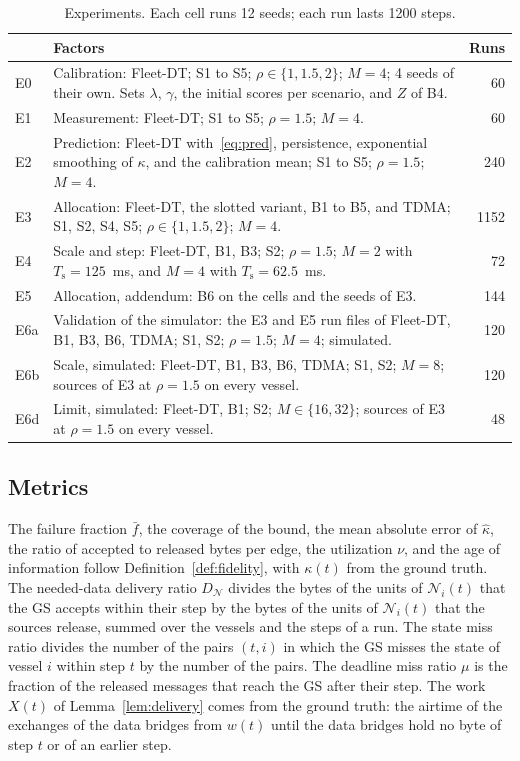 \begin{table}[t]
\caption{Experiments. Each cell runs 12 seeds; each run lasts 1200 steps.}\label{tab:exp}
\centering\footnotesize
\begin{tabular}{@{}lp{6.3cm}r@{}}
\toprule
& Factors & Runs \\
\midrule
E0 & Calibration: Fleet-DT; S1 to S5; $\rho \in \{1, 1.5, 2\}$; $M = 4$; 4 seeds of their own. Sets $\lambda$, $\gamma$, the initial scores per scenario, and $Z$ of B4. & 60 \\
E1 & Measurement: Fleet-DT; S1 to S5; $\rho = 1.5$; $M = 4$. & 60 \\
E2 & Prediction: Fleet-DT with~\eqref{eq:pred}, persistence, exponential smoothing of $\kappa$, and the calibration mean; S1 to S5; $\rho = 1.5$; $M = 4$. & 240 \\
E3 & Allocation: Fleet-DT, the slotted variant, B1 to B5, and TDMA; S1, S2, S4, S5; $\rho \in \{1, 1.5, 2\}$; $M = 4$. & 1152 \\
E4 & Scale and step: Fleet-DT, B1, B3; S2; $\rho = 1.5$; $M = 2$ with $T_{\mathrm{s}} = 125$~ms, and $M = 4$ with $T_{\mathrm{s}} = 62.5$~ms. & 72 \\
\midrule
E5 & Allocation, addendum: B6 on the cells and the seeds of E3. & 144 \\
E6a & Validation of the simulator: the E3 and E5 run files of Fleet-DT, B1, B3, B6, TDMA; S1, S2; $\rho = 1.5$; $M = 4$; simulated. & 120 \\
E6b & Scale, simulated: Fleet-DT, B1, B3, B6, TDMA; S1, S2; $M = 8$; sources of E3 at $\rho = 1.5$ on every vessel. & 120 \\
E6d & Limit, simulated: Fleet-DT, B1; S2; $M \in \{16, 32\}$; sources of E3 at $\rho = 1.5$ on every vessel. & 48 \\
\bottomrule
\end{tabular}
\end{table}

\subsection{Metrics}\label{subsec:metrics}

The failure fraction $\bar{f}$, the coverage of the bound, the mean absolute error of $\hat{\kappa}$, the ratio of accepted to released bytes per edge, the utilization $\nu$, and the age of information follow Definition~\ref{def:fidelity}, with $\kappa(t)$ from the ground truth. The needed-data delivery ratio $D_{\mathcal{N}}$ divides the bytes of the units of $\mathcal{N}_i(t)$ that the GS accepts within their step by the bytes of the units of $\mathcal{N}_i(t)$ that the sources release, summed over the vessels and the steps of a run. The state miss ratio divides the number of the pairs $(t, i)$ in which the GS misses the state of vessel $i$ within step $t$ by the number of the pairs. The deadline miss ratio $\mu$ is the fraction of the released messages that reach the GS after their step. The work $X(t)$ of Lemma~\ref{lem:delivery} comes from the ground truth: the airtime of the exchanges of the data bridges from $w(t)$ until the data bridges hold no byte of step $t$ or of an earlier step.

